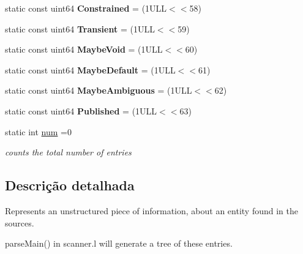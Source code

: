 \begin{DoxyCompactItemize}
\item 
\hypertarget{class_entry_a3270eee7656c68d357ba98edf099d74e}{static const uint64 {\bfseries Constrained} = (1\-U\-L\-L$<$$<$58)}\label{class_entry_a3270eee7656c68d357ba98edf099d74e}

\item 
\hypertarget{class_entry_a7106fe96f7abc67a366bfbbd2e1ee850}{static const uint64 {\bfseries Transient} = (1\-U\-L\-L$<$$<$59)}\label{class_entry_a7106fe96f7abc67a366bfbbd2e1ee850}

\item 
\hypertarget{class_entry_a37ff3f5c63fef677986b82f4f528c116}{static const uint64 {\bfseries Maybe\-Void} = (1\-U\-L\-L$<$$<$60)}\label{class_entry_a37ff3f5c63fef677986b82f4f528c116}

\item 
\hypertarget{class_entry_aa225a5e178d805c02e80adb3f67490b6}{static const uint64 {\bfseries Maybe\-Default} = (1\-U\-L\-L$<$$<$61)}\label{class_entry_aa225a5e178d805c02e80adb3f67490b6}

\item 
\hypertarget{class_entry_a33ee40d8e6f015305a4d3559f18f56d9}{static const uint64 {\bfseries Maybe\-Ambiguous} = (1\-U\-L\-L$<$$<$62)}\label{class_entry_a33ee40d8e6f015305a4d3559f18f56d9}

\item 
\hypertarget{class_entry_a195b099e5245f59a8d7ef10cf78b1fcd}{static const uint64 {\bfseries Published} = (1\-U\-L\-L$<$$<$63)}\label{class_entry_a195b099e5245f59a8d7ef10cf78b1fcd}

\item 
\hypertarget{class_entry_a86cf672daa4e0ad11ad10efc894d19c8}{static int \hyperlink{class_entry_a86cf672daa4e0ad11ad10efc894d19c8}{num} =0}\label{class_entry_a86cf672daa4e0ad11ad10efc894d19c8}

\begin{DoxyCompactList}\small\item\em counts the total number of entries \end{DoxyCompactList}\end{DoxyCompactItemize}


\subsection{Descrição detalhada}
Represents an unstructured piece of information, about an entity found in the sources.

parse\-Main() in scanner.\-l will generate a tree of these entries. 

